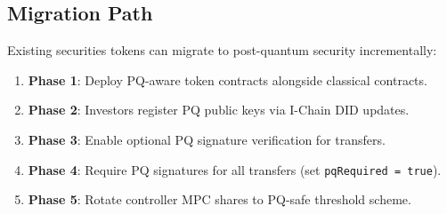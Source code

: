 \subsection{Migration Path}

Existing securities tokens can migrate to post-quantum security incrementally:

\begin{enumerate}[nosep]
  \item \textbf{Phase 1}: Deploy PQ-aware token contracts alongside classical contracts.
  \item \textbf{Phase 2}: Investors register PQ public keys via I-Chain DID updates.
  \item \textbf{Phase 3}: Enable optional PQ signature verification for transfers.
  \item \textbf{Phase 4}: Require PQ signatures for all transfers (set \texttt{pqRequired = true}).
  \item \textbf{Phase 5}: Rotate controller MPC shares to PQ-safe threshold scheme.
\end{enumerate}

